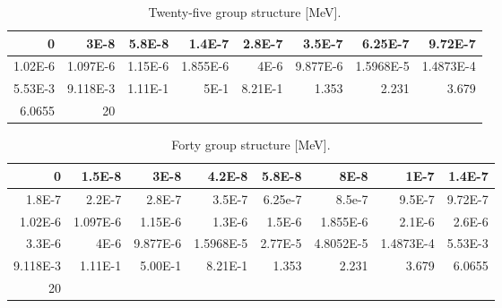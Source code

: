 \begin{appendices}
\begin{table}[h!]
  \centering
  \footnotesize
  \caption{Twenty-five group structure [MeV].}
  \label{table:app-25-groups} 
  \vspace{14pt}
  \begin{tabular}{r|r|r|r|r|r|r|r}
  \toprule
  0 & 3E-8 & 5.8E-8 & 1.4E-7 & 2.8E-7 & 3.5E-7 & 6.25E-7 & 9.72E-7 \\
  \midrule
  1.02E-6 & 1.097E-6 & 1.15E-6 & 1.855E-6 & 4E-6 & 9.877E-6 & 1.5968E-5 & 1.4873E-4 \\
  \midrule
  5.53E-3 & 9.118E-3 & 1.11E-1 & 5E-1 & 8.21E-1 & 1.353 & 2.231 & 3.679 \\
  \midrule
  6.0655 & 20 \\
  \bottomrule
 \end{tabular}
\end{table}

\begin{table}[h!]
  \centering	
  \footnotesize
  \caption{Forty group structure [MeV].}
  \label{table:app-40-groups} 
  \vspace{14pt}
  \begin{tabular}{r|r|r|r|r|r|r|r}
  \toprule
  0 & 1.5E-8 & 3E-8 & 4.2E-8 & 5.8E-8 & 8E-8 & 1E-7 & 1.4E-7 \\
  \midrule
  1.8E-7 & 2.2E-7 & 2.8E-7 & 3.5E-7 & 6.25e-7 & 8.5e-7 & 9.5E-7 & 9.72E-7 \\ 
  \midrule
  1.02E-6 & 1.097E-6 & 1.15E-6 & 1.3E-6 & 1.5E-6 & 1.855E-6 & 2.1E-6 & 2.6E-6 \\
  \midrule
  3.3E-6 & 4E-6 & 9.877E-6 & 1.5968E-5 & 2.77E-5 & 4.8052E-5 & 1.4873E-4 & 5.53E-3  \\   
  \midrule
  9.118E-3 & 1.11E-1 & 5.00E-1 & 8.21E-1 & 1.353 & 2.231 & 3.679 & 6.0655 \\
  \midrule
  20 \\
  \bottomrule
 \end{tabular}
\end{table}



\end{appendices}
